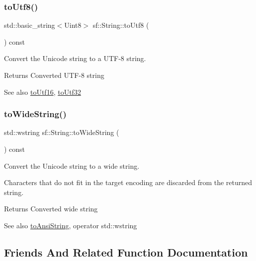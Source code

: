 \subsubsection{\texorpdfstring{to\+Utf8()}{toUtf8()}}
{\footnotesize\ttfamily std\+::basic\+\_\+string$<$Uint8$>$ sf\+::\+String\+::to\+Utf8 (\begin{DoxyParamCaption}{ }\end{DoxyParamCaption}) const}



Convert the Unicode string to a U\+T\+F-\/8 string. 

\begin{DoxyReturn}{Returns}
Converted U\+T\+F-\/8 string
\end{DoxyReturn}
\begin{DoxySeeAlso}{See also}
\hyperlink{classsf_1_1_string_a476374646d92143c0efcae8ac1fbe4ce}{to\+Utf16}, \hyperlink{classsf_1_1_string_af1f2a3c069ce9e53fe901065cff41f68}{to\+Utf32} 
\end{DoxySeeAlso}
\mbox{\label{classsf_1_1_string_a9d81aa3103e7e2062bd85d912a5aecf1}} 
\subsubsection{\texorpdfstring{to\+Wide\+String()}{toWideString()}}
{\footnotesize\ttfamily std\+::wstring sf\+::\+String\+::to\+Wide\+String (\begin{DoxyParamCaption}{ }\end{DoxyParamCaption}) const}



Convert the Unicode string to a wide string. 

Characters that do not fit in the target encoding are discarded from the returned string.

\begin{DoxyReturn}{Returns}
Converted wide string
\end{DoxyReturn}
\begin{DoxySeeAlso}{See also}
\hyperlink{classsf_1_1_string_ada5d5bba4528aceb0a1e298553e6c30a}{to\+Ansi\+String}, operator std\+::wstring 
\end{DoxySeeAlso}


\subsection{Friends And Related Function Documentation}
\mbox{\label{classsf_1_1_string_a2b592c36be218b4811795fdc84eecc69}} 
